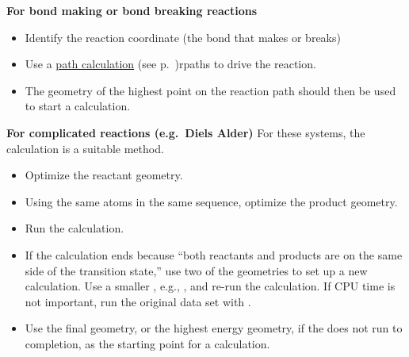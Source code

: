 {\bf For bond making or bond breaking reactions}
\begin{itemize}
\item Identify the reaction coordinate (the bond that makes or breaks)
\item Use a \hyperref[pageref]{path calculation}{ (see 
p.~}{)}{rpaths} to drive the reaction.
\item The geometry of the highest point on the reaction path should then be 
used to start a  calculation.
\end{itemize}

{\bf For complicated reactions (e.g.\ Diels Alder)}
For these systems, the  calculation is a suitable method.
\begin{itemize}
\item Optimize the reactant geometry.
\item Using the same atoms in the same sequence, optimize the product geometry.
\item Run the  calculation.
\item If the calculation ends because ``both reactants and products are on
 the same side of the transition state,'' use two of the geometries to set
up a new  calculation.  Use a smaller , e.g.,
, and re-run the calculation.  If CPU time is not important,
run the original data set with .
\item Use the final geometry, or the highest energy geometry, if the 
 does not run to completion, as the starting point for a 
 calculation.
\end{itemize}
